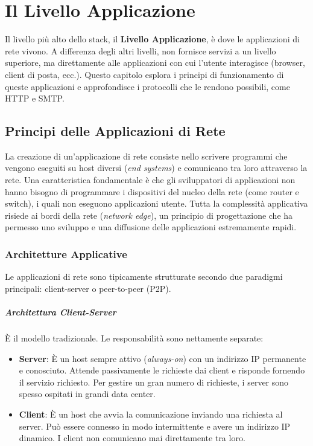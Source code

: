 \chapter{Il Livello Applicazione}
Il livello più alto dello stack, il \textbf{Livello Applicazione}, è dove le applicazioni di rete vivono. A differenza degli altri livelli, non fornisce servizi a un livello superiore, ma direttamente alle applicazioni con cui l'utente interagisce (browser, client di posta, ecc.). Questo capitolo esplora i principi di funzionamento di queste applicazioni e approfondisce i protocolli che le rendono possibili, come HTTP e SMTP.

\section{Principi delle Applicazioni di Rete}
La creazione di un'applicazione di rete consiste nello scrivere programmi che vengono eseguiti su host diversi (\textit{end systems}) e comunicano tra loro attraverso la rete. Una caratteristica fondamentale è che gli sviluppatori di applicazioni non hanno bisogno di programmare i dispositivi del nucleo della rete (come router e switch), i quali non eseguono applicazioni utente. Tutta la complessità applicativa risiede ai bordi della rete (\textit{network edge}), un principio di progettazione che ha permesso uno sviluppo e una diffusione delle applicazioni estremamente rapidi.

\subsection{Architetture Applicative}
Le applicazioni di rete sono tipicamente strutturate secondo due paradigmi principali: client-server o peer-to-peer (P2P).

\paragraph{Architettura Client-Server}
È il modello tradizionale. Le responsabilità sono nettamente separate:
\begin{itemize}
    \item \textbf{Server}: È un host sempre attivo (\textit{always-on}) con un indirizzo IP permanente e conosciuto. Attende passivamente le richieste dai client e risponde fornendo il servizio richiesto. Per gestire un gran numero di richieste, i server sono spesso ospitati in grandi data center.
    \item \textbf{Client}: È un host che avvia la comunicazione inviando una richiesta al server. Può essere connesso in modo intermittente e avere un indirizzo IP dinamico. I client non comunicano mai direttamente tra loro.
\end{itemize}

